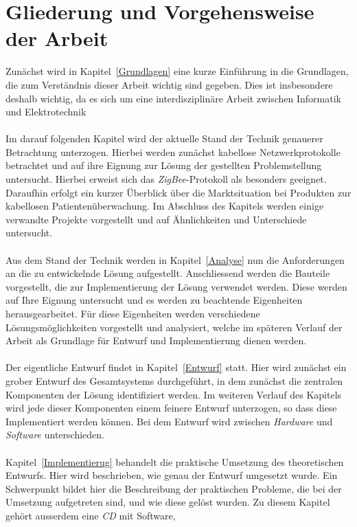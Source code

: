 \section{Gliederung und Vorgehensweise der Arbeit}
Zunächst wird in Kapitel~\ref{Grundlagen} eine kurze Einführung in die Grundlagen,
die zum Verständnis dieser Arbeit wichtig sind gegeben. Dies ist insbesondere deshalb
wichtig, da es sich um eine interdisziplinäre Arbeit zwischen Informatik und Elektrotechnik\\
\\
Im darauf folgenden Kapitel wird der aktuelle Stand der Technik genauerer Betrachtung
unterzogen. Hierbei werden zunächst kabellose Netzwerkprotokolle betrachtet und auf
ihre Eignung zur Lösung der gestellten Problemstellung untersucht. Hierbei erweist
sich das \emph{ZigBee}-Protokoll als besonders geeignet. Daraufhin erfolgt
ein kurzer Überblick über die Marktsituation bei Produkten zur kabellosen
Patientenüberwachung. Im Abschluss des Kapitels werden einige verwandte Projekte
vorgestellt und auf Ähnlichkeiten und Unterschiede untersucht.\\
\\
Aus dem Stand der Technik werden in Kapitel~\ref{Analyse} nun die Anforderungen an
die zu entwickelnde Lösung aufgestellt. Anschliessend werden die Bauteile vorgestellt,
die zur Implementierung der Lösung verwendet werden. Diese werden auf Ihre Eignung
untersucht und es werden zu beachtende Eigenheiten herausgearbeitet. Für diese
Eigenheiten werden verschiedene Lösungsmöglichkeiten vorgestellt und analysiert,
welche im späteren Verlauf der Arbeit als Grundlage für Entwurf und Implementierung
dienen werden.\\
\\
Der eigentliche Entwurf findet in Kapitel~\ref{Entwurf} statt. Hier wird zunächst
ein grober Entwurf des Gesamtsystems durchgeführt, in dem zunächst die zentralen
Komponenten der Lösung identifiziert werden. Im weiteren Verlauf des Kapitels
wird jede dieser Komponenten einem feinere Entwurf unterzogen, so dass diese
Implementiert werden können. Bei dem Entwurf wird zwischen \emph{Hardware}
und \emph{Software} unterschieden.\\
\\
Kapitel~\ref{Implementierug} behandelt die praktische Umsetzung des theoretischen Entwurfs.
Hier wird beschrieben, wie genau der Entwurf umgesetzt wurde. Ein Schwerpunkt bildet
hier die Beschreibung der praktischen Probleme, die bei der Umsetzung aufgetreten sind, 
und wie diese gelöst wurden. Zu diesem Kapitel gehört ausserdem eine \emph{CD} mit Software,
